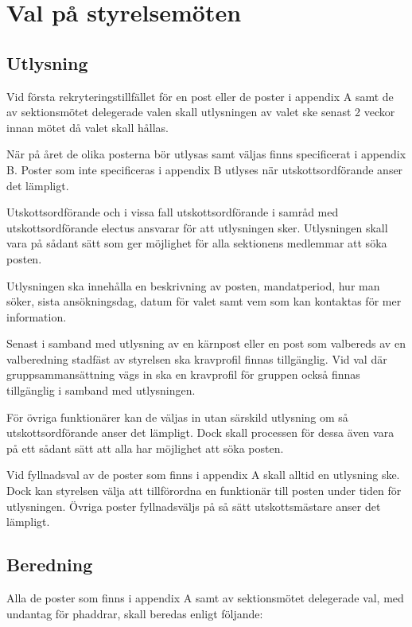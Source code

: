 \documentclass{dsekprotokoll}
\begin{document}
\section{Val på styrelsemöten}

\subsection{Utlysning}
Vid första rekryteringstillfället för en post eller de poster i appendix A samt de av sektionsmötet delegerade valen skall utlysningen av valet ske senast 2 veckor innan mötet då valet skall hållas.

När på året de olika posterna bör utlysas samt väljas finns specificerat i appendix B. Poster som inte specificeras i appendix B utlyses när utskottsordförande anser det lämpligt.

Utskottsordförande och i vissa fall utskottsordförande i samråd med utskottsordförande electus ansvarar för att utlysningen sker. Utlysningen skall vara på sådant sätt som ger möjlighet för alla sektionens medlemmar att söka posten.

Utlysningen ska innehålla en beskrivning av posten, mandatperiod, hur man söker, sista ansökningsdag, datum för valet samt vem som kan kontaktas för mer information.

Senast i samband med utlysning av en kärnpost eller en post som valbereds av en
valberedning stadfäst av styrelsen ska kravprofil finnas tillgänglig. Vid val där gruppsammansättning vägs in ska en kravprofil för gruppen också finnas
tillgänglig i samband med utlysningen.

För övriga funktionärer kan de väljas in utan särskild utlysning om så utskottsordförande anser det lämpligt. Dock skall processen för dessa även vara på ett sådant sätt att alla har möjlighet att söka posten.

Vid fyllnadsval av de poster som finns i appendix A skall alltid en utlysning ske. Dock kan styrelsen välja att tillförordna en funktionär till posten under tiden för utlysningen. Övriga poster fyllnadsväljs på så sätt utskottsmästare anser det lämpligt.

\subsection{Beredning}

Alla de poster som finns i appendix A samt av sektionsmötet delegerade val, med undantag för phaddrar, skall beredas enligt följande: 
\end{document}
